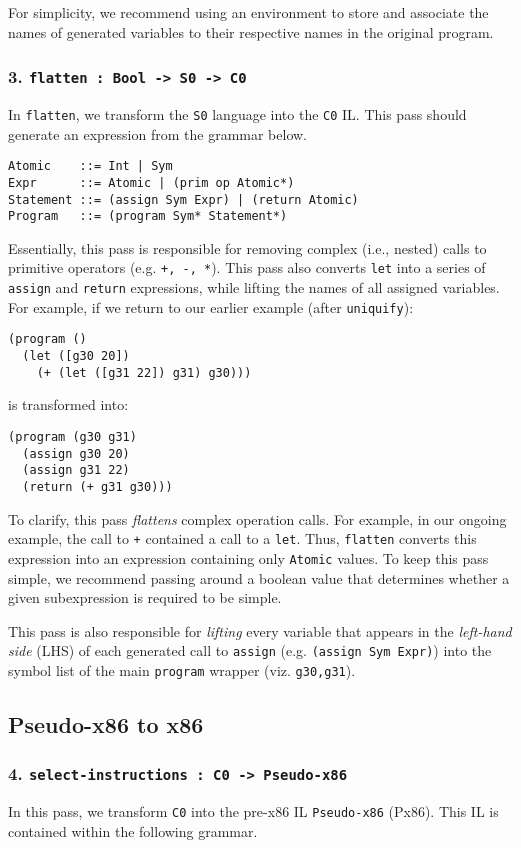 \documentclass[12pt]{article}
\begin{document}
For simplicity, we recommend using an environment to store and associate the
names of generated variables to their respective names in the original program.

\subsubsection*{3. {\tt flatten : Bool -> S0 -> C0}}
In {\tt flatten}, we transform the {\tt S0} language into the {\tt C0} IL.
This pass should generate an expression from the grammar below.
\begin{verbatim}
Atomic    ::= Int | Sym
Expr      ::= Atomic | (prim op Atomic*)
Statement ::= (assign Sym Expr) | (return Atomic)
Program   ::= (program Sym* Statement*)
\end{verbatim}

Essentially, this pass is responsible for removing complex (i.e., nested) calls
to primitive operators (e.g. {\tt +, -, *}). This pass also converts {\tt let}
into a series of {\tt assign} and {\tt return} expressions, while lifting the
names of all assigned variables. For example, if we return to our earlier
example (after {\tt uniquify}):
\begin{verbatim}
(program ()
  (let ([g30 20])
    (+ (let ([g31 22]) g31) g30)))
\end{verbatim}
is transformed into:
\begin{verbatim}
(program (g30 g31) 
  (assign g30 20)
  (assign g31 22)
  (return (+ g31 g30)))
\end{verbatim}

To clarify, this pass \textit{flattens} complex operation calls. For example,
in our ongoing example, the call to {\tt +} contained a call to a {\tt let}.
Thus, {\tt flatten} converts this expression into an expression containing only
{\tt Atomic} values. To keep this pass simple, we recommend passing around a
boolean value that determines whether a given subexpression is required to be
simple.

This pass is also responsible for \textit{lifting} every variable that appears
in the \textit{left-hand side} (LHS) of each generated call to {\tt assign}
(e.g. {\tt (assign Sym Expr)}) into the symbol list of the main {\tt program}
wrapper (viz. {\tt g30,g31}).

\subsection*{Pseudo-x86 to x86}
\subsubsection*{4. {\tt select-instructions : C0 -> Pseudo-x86}}
In this pass, we transform {\tt C0} into the pre-x86 IL {\tt Pseudo-x86} (Px86).
This IL is contained within the following grammar.
\end{document}
